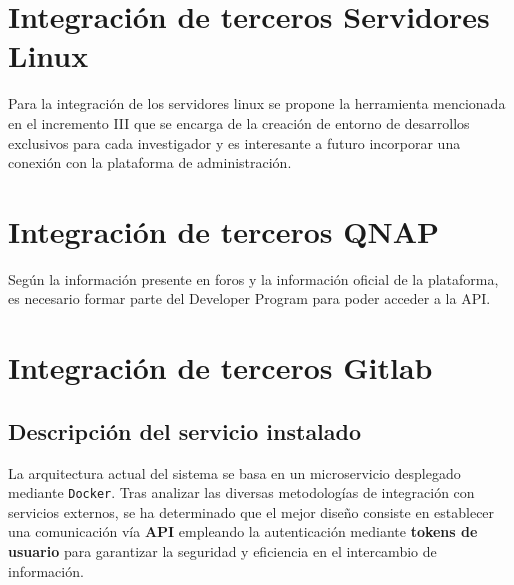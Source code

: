 

\section{Integración de terceros Servidores Linux}
Para la integración de los servidores linux se propone la herramienta mencionada en el incremento III que se encarga de la creación de entorno de desarrollos exclusivos para cada investigador y es interesante a futuro incorporar una conexión con la plataforma de administración.

\section{Integración de terceros QNAP}

Según la información presente en foros y la información oficial de la plataforma, es necesario formar parte del Developer Program para poder acceder a la API. \cite{qnap_developer, reddit_qnap_automation} 


\section{Integración de terceros Gitlab}

\subsection{Descripción del servicio instalado}

La arquitectura actual del sistema se basa en un microservicio desplegado mediante \texttt{Docker}. Tras analizar las diversas metodologías de integración con servicios externos, se ha determinado que el mejor diseño consiste en establecer una comunicación vía \textbf{API} empleando la autenticación mediante \textbf{tokens de usuario} para garantizar la seguridad y eficiencia en el intercambio de información. \cite{GITLAB_TOKEN}

